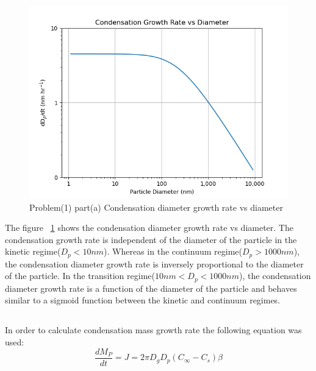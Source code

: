 \documentclass[12pt]{article}
\begin{document}
\begin{figure}[H]\label{fig:problem-1-a}
    \begin{center}
        \includegraphics[width=5in]{hw2_pr1_1_condensation_growth_rate_vs_diameter.png}
        \caption{Problem(1) part(a) Condensation diameter growth rate vs diameter}
    \end{center}
\end{figure}

The figure ~\ref{fig:problem-1-a} shows the condensation diameter growth rate vs diameter.
The condensation growth rate is independent of the diameter of the particle in the kinetic regime($D_p < 10nm$).
Whereas in the continuum regime($D_p > 1000nm$), the condensation diameter growth rate is inversely proportional to the diameter of the particle.
In the transition regime($10nm < D_p < 1000nm$), the condensation diameter growth rate is a function of the diameter of the particle and behaves similar to a sigmoid function between the kinetic and continuum regimes.



\subsection{}\label{subsec:problem-1-b}

 In order to calculate condensation mass growth rate the following equation was used:
\[\frac{dM_P}{dt}=J=2\pi D_g D_p(C_\infty-C_s)\beta\]
\end{document}
